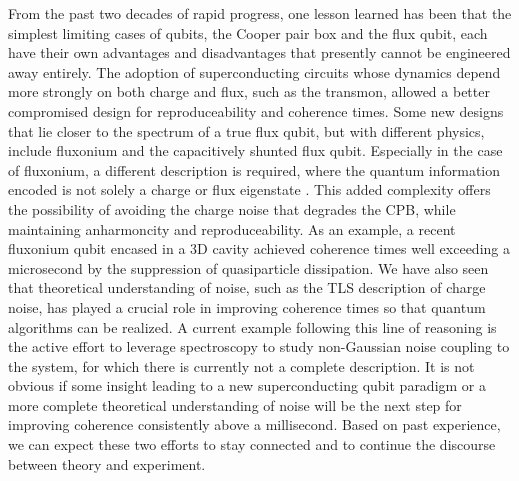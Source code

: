\documentclass[%
 reprint,
showpacs,
 amsmath,amssymb,
 aps,
longbibliography,
]{revtex4-1}
\begin{document}
From the past two decades of rapid progress, one lesson learned has been that the simplest limiting cases of qubits, the Cooper pair box and the flux qubit, each have their own advantages and disadvantages that presently cannot be engineered away entirely. The adoption of superconducting circuits whose dynamics depend more strongly on both charge and flux, such as the transmon, allowed a better compromised design for reproduceability and coherence times. Some new designs that lie closer to the spectrum of a true flux qubit, but with different physics, include fluxonium and the capacitively shunted flux qubit\citep{CSFQ}. Especially in the case of fluxonium, a different description is required, where the quantum information encoded is not solely a charge or flux eigenstate \cite{fluxoniumtheory}. This added complexity offers the possibility of avoiding the charge noise that degrades the CPB, while maintaining anharmoncity and reproduceability. As an example, a recent fluxonium qubit encased in a 3D cavity achieved coherence times well exceeding a microsecond \cite{fluxonium_quasiparticle} by the suppression of quasiparticle dissipation. We have also seen that theoretical understanding of noise, such as the TLS description of charge noise, has played a crucial role in improving coherence times so that quantum algorithms can be realized. A current example following this line of reasoning is the active effort to leverage spectroscopy to study non-Gaussian noise \cite{non_gaussian_noise} coupling to the system, for which there is currently not a complete description. It is not obvious if some insight leading to a new superconducting qubit paradigm or a more complete theoretical understanding of noise will be the next step for improving coherence consistently above a millisecond. Based on past experience, we can expect these two efforts to stay connected and to continue the discourse between theory and experiment.  



%
%


\end{document}
